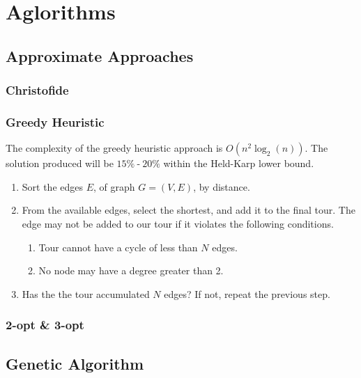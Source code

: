 \documentclass[margin=5mm]{standalone}
\begin{document}
  \section{Aglorithms}
    \subsection{Approximate Approaches}
    \subsubsection{Christofide}
    \subsubsection{Greedy Heuristic}
      The complexity of the greedy heuristic approach  is $O(n^2\log_2(n))$. The
      solution produced will be $15\% \operatorname{-} 20\%$ within the
      Held-Karp lower bound.
      \begin{enumerate}
        \item Sort the edges $E$, of graph $G=(V,E)$, by distance.
        \item From the available edges, select the shortest, and add it to the
              final tour. The edge may not be added to our tour if it violates
              the following conditions.
              \begin{enumerate}
                \item Tour cannot have a cycle of less than $N$ edges.
                \item No node may have a degree greater than 2.
              \end{enumerate}
        \item Has the the tour accumulated $N$ edges? If not, repeat the previous step.
      \end{enumerate}
    \subsubsection{2-opt \& 3-opt}
    \subsection{Genetic Algorithm}
\end{document}
